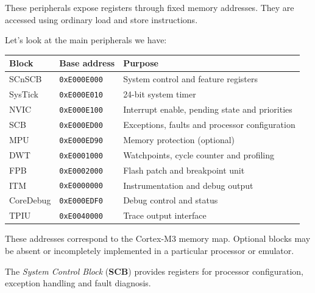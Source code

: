 \documentclass[a4paper,11pt]{article}
\begin{document}
These peripherals expose registers through fixed memory addresses. They
are accessed using ordinary load and store instructions.

Let's look at the main peripherals we have:
\begin{table}[H]
	\centering
	\begin{tabular}{lll}
		\hline
		Block     & Base address        & Purpose                                        \\
		\hline
		SCnSCB    & \texttt{0xE000E000} & System control and feature registers           \\
		SysTick   & \texttt{0xE000E010} & 24-bit system timer                            \\
		NVIC      & \texttt{0xE000E100} & Interrupt enable, pending state and priorities \\
		SCB       & \texttt{0xE000ED00} & Exceptions, faults and processor configuration \\
		MPU       & \texttt{0xE000ED90} & Memory protection (optional)                   \\
		DWT       & \texttt{0xE0001000} & Watchpoints, cycle counter and profiling       \\
		FPB       & \texttt{0xE0002000} & Flash patch and breakpoint unit                \\
		ITM       & \texttt{0xE0000000} & Instrumentation and debug output               \\
		CoreDebug & \texttt{0xE000EDF0} & Debug control and status                       \\
		TPIU      & \texttt{0xE0040000} & Trace output interface                         \\
		\hline
	\end{tabular}
\end{table}

These addresses correspond to the Cortex-M3 memory map. Optional blocks
may be absent or incompletely implemented in a particular processor or
emulator.

The \textit{System Control Block} (\textbf{SCB}) provides registers for processor
configuration, exception handling and fault diagnosis.
\end{document}
